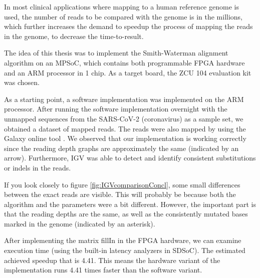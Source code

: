 In most clinical applications where mapping to a human reference genome is used, the number of reads to be compared with the genome is in the millions, which further increases the demand to speedup the process of mapping the reads in the genome, to decrease the time-to-result.

The idea of this thesis was to implement the Smith-Waterman alignment algorithm on an MPSoC, which contains both programmable FPGA hardware and an ARM processor in 1 chip. As a target board, the ZCU 104 evaluation kit was chosen.

As a starting point, a software implementation was implemented on the ARM processor. After running the software implementation overnight with the unmapped sequences from the SARS-CoV-2 (coronavirus) as a sample set, we obtained a dataset of mapped reads. The reads were also mapped by using the Galaxy online tool \cite{13}. We observed that our implementation is working correctly since the reading depth graphs are approximately the same (indicated by an arrow). Furthermore, IGV was able to detect and identify consistent substitutions or indels in the reads.

If you look closely to figure \ref{fig:IGVcomparisonConcl}, some small differences between the exact reads are visible. This will probably be because both the algorithm and the parameters were a bit different. However, the important part is that the reading depths are the same, as well as the consistently mutated bases marked in the genome (indicated by an asterisk).

After implementing the matrix fillIn in the FPGA hardware, we can examine execution time (using the built-in latency analyzers in SDSoC). The estimated achieved speedup that is 4.41. This means the hardware variant of the implementation runs 4.41 times faster than the software variant.